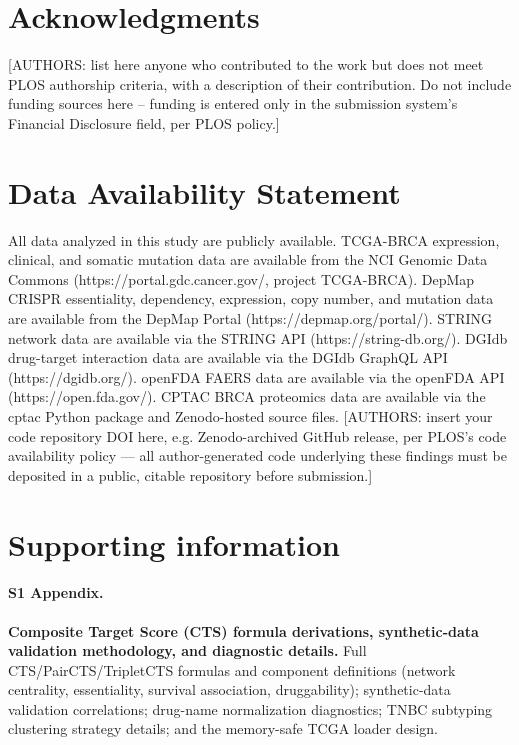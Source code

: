 \documentclass[10pt,letterpaper]{article}
\begin{document}
\section*{Acknowledgments}

[AUTHORS: list here anyone who contributed to the work but does not meet PLOS authorship
criteria, with a description of their contribution. Do not include funding sources here --
funding is entered only in the submission system's Financial Disclosure field, per PLOS
policy.]

\section*{Data Availability Statement}
All data analyzed in this study are publicly available. TCGA-BRCA expression, clinical, and somatic mutation data are available from the NCI Genomic Data Commons (https://portal.gdc.cancer.gov/, project TCGA-BRCA). DepMap CRISPR essentiality, dependency, expression, copy number, and mutation data are available from the DepMap Portal (https://depmap.org/portal/). STRING network data are available via the STRING API (https://string-db.org/). DGIdb drug-target interaction data are available via the DGIdb GraphQL API (https://dgidb.org/). openFDA FAERS data are available via the openFDA API (https://open.fda.gov/). CPTAC BRCA proteomics data are available via the cptac Python package and Zenodo-hosted source files. [AUTHORS: insert your code repository DOI here, e.g. Zenodo-archived GitHub release, per PLOS's code availability policy --- all author-generated code underlying these findings must be deposited in a public, citable repository before submission.]

\section*{Supporting information}

\paragraph*{S1 Appendix.}
\label{S1_Appendix}
\textbf{Composite Target Score (CTS) formula derivations, synthetic-data validation
methodology, and diagnostic details.} Full CTS/PairCTS/TripletCTS formulas and
component definitions (network centrality, essentiality, survival association,
druggability); synthetic-data validation correlations; drug-name normalization
diagnostics; TNBC subtyping clustering strategy details; and the memory-safe TCGA
loader design.
\end{document}
